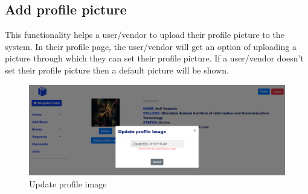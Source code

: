 \documentclass[conference]{IEEEtran}
\begin{document}
\subsection{Add profile picture}
This functionality helps a user/vendor to upload their profile picture to the system. In their profile page, the user/vendor will get an option of uploading a picture through which they can set their profile picture. If a user/vendor doesn't set their profile picture then a default picture will be shown.
\begin{figure}[h]
     \centering
     \includegraphics[scale=0.20,margin=2,frame]{profileimage.PNG}
     \caption{Update profile image}
     \label{fig:profilepicture}
 \end{figure}
\end{document}
